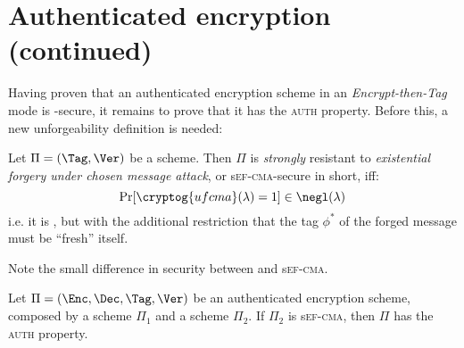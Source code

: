 
\section{Authenticated encryption (continued)}

Having proven that an authenticated encryption scheme in an \emph{Encrypt-then-Tag} mode is \cpa-secure, it remains to prove that it has the \textsc{auth} property. Before this, a new unforgeability definition is needed:

\begin{definition}
    Let $\Pi = (\Tag, \Ver)$ be a \mac{} scheme. Then $\Pi$ is \emph{strongly} resistant to \emph{existential forgery under chosen message attack}, or s\textsc{ef-cma}-secure in short, iff:
    \[
        \Pr[\cryptog{ufcma}(\lambda) = 1] \in \negl(\lambda)
    \]
    i.e. it is \ufcma, but with the additional restriction that the tag $\phi^*$ of the forged message must be ``fresh'' itself.
\end{definition}

Note the small difference in security between \ufcma{} and s\textsc{ef-cma}.

\begin{theorem}
    Let $\Pi = (\Enc, \Dec, \Tag, \Ver)$ be an authenticated encryption scheme, composed by a \ske{} scheme $\Pi_1$ and a \mac{} scheme $\Pi_2$. If $\Pi_2$ is s\textsc{ef-cma}, then $\Pi$ has the \textsc{auth} property.
\end{theorem}

